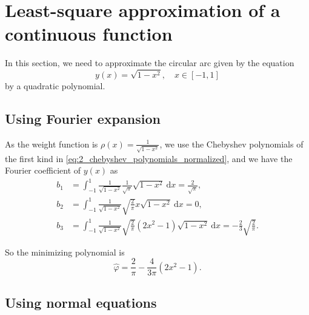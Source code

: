\documentclass[a4paper]{article}
\begin{document}
\section{Least-square approximation of a continuous function}

In this section, we need to approximate the circular arc given by the equation
\begin{equation}
    y(x) = \sqrt{1 - x^2},\quad x \in [-1, 1]
    \label{eq:3_circular_arc}
\end{equation}
by a quadratic polynomial.

\subsection{Using Fourier expansion}

As the weight function is $\rho(x) = \frac{1}{\sqrt{1 - x^2}}$, we use the Chebyshev polynomials of the first kind in \cref{eq:2_chebyshev_polynomials_normalized}, and we have the Fourier coefficient of $y(x)$ as 
\begin{equation}
    \begin{aligned}
        b_1 &= \int_{-1}^1 \frac{1}{\sqrt{1 - x^2}} \frac{1}{\sqrt{\pi}} \sqrt{1 - x^2}\ \mathrm{d} x = \frac{2}{\sqrt{\pi}}, \\
        b_2 &= \int_{-1}^1 \frac{1}{\sqrt{1 - x^2}} \sqrt{\frac{2}{\pi}}x \sqrt{1 - x^2}\ \mathrm{d} x = 0, \\
        b_3 &= \int_{-1}^1 \frac{1}{\sqrt{1 - x^2}} \sqrt{\frac{2}{\pi}}(2x^2 - 1) \sqrt{1 - x^2} \ \mathrm{d} x = -\frac{2}{3}\sqrt{\frac{2}{\pi}}.
    \end{aligned}
    \label{eq:3_fourier_coefficient}
\end{equation}

So the minimizing polynomial is 
\begin{equation}
    \hat{\varphi} = \frac{2}{\pi} - \frac{4}{3\pi}(2x^2 - 1).
    \label{eq:3_minimizing_polynomial}
\end{equation}

\subsection{Using normal equations}
\end{document}
